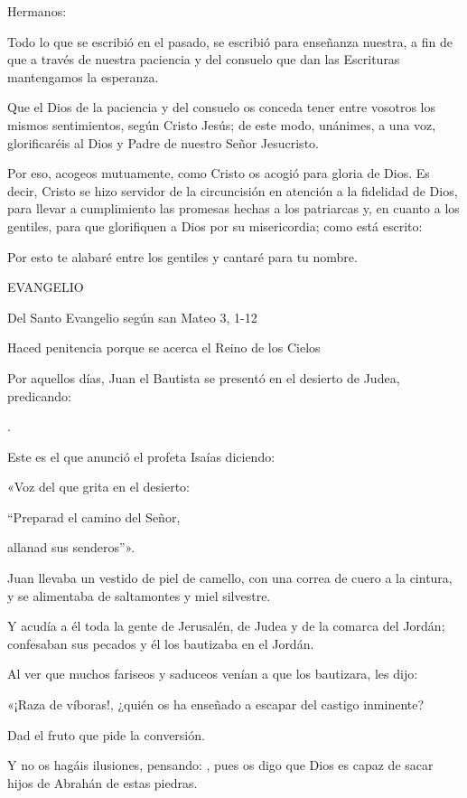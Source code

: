 Hermanos:

Todo lo que se escribió en el pasado, se escribió para enseñanza
nuestra, a fin de que a través de nuestra paciencia y del consuelo que
dan las Escrituras mantengamos la esperanza.

Que el Dios de la paciencia y del consuelo os conceda tener entre
vosotros los mismos sentimientos, según Cristo Jesús; de este modo,
unánimes, a una voz, glorificaréis al Dios y Padre de nuestro Señor
Jesucristo.

Por eso, acogeos mutuamente, como Cristo os acogió para gloria de Dios.
Es decir, Cristo se hizo servidor de la circuncisión en atención a la
fidelidad de Dios, para llevar a cumplimiento las promesas hechas a los
patriarcas y, en cuanto a los gentiles, para que glorifiquen a Dios por
su misericordia; como está escrito:

Por esto te alabaré entre los gentiles y cantaré para tu nombre.

EVANGELIO

Del Santo Evangelio según san Mateo 3, 1-12

Haced penitencia porque se acerca el Reino de los Cielos

Por aquellos días, Juan el Bautista se presentó en el desierto de Judea,
predicando:

.

Este es el que anunció el profeta Isaías diciendo:

«Voz del que grita en el desierto:

``Preparad el camino del Señor,

allanad sus senderos''».

Juan llevaba un vestido de piel de camello, con una correa de cuero a la
cintura, y se alimentaba de saltamontes y miel silvestre.

Y acudía a él toda la gente de Jerusalén, de Judea y de la comarca del
Jordán; confesaban sus pecados y él los bautizaba en el Jordán.

Al ver que muchos fariseos y saduceos venían a que los bautizara, les
dijo:

«¡Raza de víboras!, ¿quién os ha enseñado a escapar del castigo
inminente?

Dad el fruto que pide la conversión.

Y no os hagáis ilusiones, pensando: ,
pues os digo que Dios es capaz de sacar hijos de Abrahán de estas
piedras.

